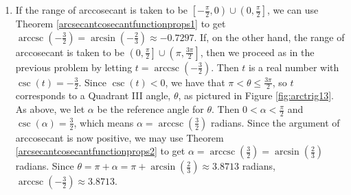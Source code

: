 {\begin{enumerate}
\begin{enumerate}


Another way to attack the problem is to use $\arctan\left(-\frac{1}{2}\right)$.  By definition, the real number $t = \arctan\left(-\frac{1}{2}\right)$ satisfies $\tan(t) = -\frac{1}{2}$ with $-\frac{\pi}{2} < t < \frac{\pi}{2}$.  Since $\tan(t)<0$, we know more specifically that $-\frac{\pi}{2} < t < 0$, so $t$ corresponds to an angle $\beta$ in Quadrant IV.  To find the value of $\operatorname{arccot}(-2)$, we once again visualize the angle $\theta = \operatorname{arccot}(-2)$ radians and note that it is a Quadrant II angle with $\tan(\theta) = -\frac{1}{2}$. (See Figure \ref{fig:arctrig12}.)  This means it is exactly $\pi$ units away from $\beta$, and we get $\theta = \pi + \beta = \pi + \arctan\left(-\frac{1}{2}\right) \approx 2.6779$ radians.  Hence, as before, $\operatorname{arccot}(-2) \approx 2.6779$.


\drawexampleline

\item If the range of arccosecant is taken to be $\left[-\frac{\pi}{2}, 0\right) \cup \left(0, \frac{\pi}{2}\right]$, we can use Theorem \ref{arcsecantcosecantfunctionprops1} to get $\operatorname{arccsc}\left(-\frac{3}{2}\right) = \arcsin\left(-\frac{2}{3}\right) \approx -0.7297$.  If, on the other hand, the range of arccosecant is taken to be $\left(0, \frac{\pi}{2}\right] \cup \left(\pi, \frac{3\pi}{2}\right]$, then we proceed as in the previous problem by  letting $t = \operatorname{arccsc}\left(-\frac{3}{2}\right)$.  Then $t$ is a real number with $\csc(t) = -\frac{3}{2}$.  Since $\csc(t) < 0$, we have that $\pi < \theta \leq \frac{3\pi}{2}$, so $t$ corresponds to a Quadrant III angle, $\theta$, as pictured in Figure \ref{fig:arctrig13}.  As above, we let $\alpha$ be the reference angle for $\theta$.  Then $0 < \alpha < \frac{\pi}{2}$ and $\csc(\alpha) =\frac{3}{2}$, which means $\alpha = \operatorname{arccsc}\left(\frac{3}{2}\right)$ radians.  Since the argument of arccosecant is now positive, we may use Theorem \ref{arcsecantcosecantfunctionprops2}  to get $\alpha = \operatorname{arccsc}\left(\frac{3}{2}\right) = \arcsin\left(\frac{2}{3}\right)$ radians.  Since $\theta = \pi + \alpha = \pi +  \arcsin\left(\frac{2}{3}\right) \approx 3.8713$ radians,  $\operatorname{arccsc}\left(-\frac{3}{2}\right) \approx 3.8713$.


\end{enumerate}
\end{enumerate}}
